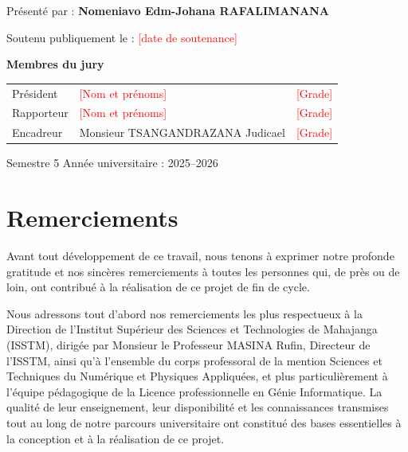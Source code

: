 \documentclass[12pt,a4paper,oneside]{report}
\newcommand{\aremplir}[1]{\textcolor{red}{[#1]}}
\begin{document}
\begin{titlepage}
\vfill
{\large Présenté par : \textbf{Nomeniavo Edm-Johana RAFALIMANANA}\par}
\vspace{0.35cm}
{\normalsize Soutenu publiquement le : \aremplir{date de soutenance}\par}

\vfill
{\large\bfseries Membres du jury\par}
\vspace{0.35cm}
{\large
\begin{tabular}{@{}l@{\quad:\quad}l@{\qquad}l@{}}
  Président  & \aremplir{Nom et prénoms}        & \aremplir{Grade} \\[5pt]
  Rapporteur & \aremplir{Nom et prénoms}        & \aremplir{Grade} \\[5pt]
  Encadreur  & Monsieur TSANGANDRAZANA Judicael & \aremplir{Grade} \\
\end{tabular}\par}

\vfill
{\large Semestre 5 \quad\textbullet\quad Année universitaire : 2025--2026\par}
\end{titlepage}
\restoregeometry


\chapter*{Remerciements}

Avant tout développement de ce travail, nous tenons à exprimer notre profonde gratitude et nos sincères remerciements à toutes les personnes qui, de près ou de loin, ont contribué à la réalisation de ce projet de fin de cycle.

Nous adressons tout d'abord nos remerciements les plus respectueux à la Direction de l'Institut Supérieur des Sciences et Technologies de Mahajanga (ISSTM), dirigée par Monsieur le Professeur MASINA Rufin, Directeur de l'ISSTM, ainsi qu'à l'ensemble du corps professoral de la mention Sciences et Techniques du Numérique et Physiques Appliquées, et plus particulièrement à l'équipe pédagogique de la Licence professionnelle en Génie Informatique. La qualité de leur enseignement, leur disponibilité et les connaissances transmises tout au long de notre parcours universitaire ont constitué des bases essentielles à la conception et à la réalisation de ce projet.
\end{document}

